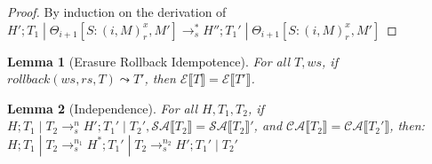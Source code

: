 \documentclass[9pt]{article}
\newtheorem{lemma}{Lemma}
\newcommand\specStep{\rightarrow_{s}}
\newcommand{\erase}[1]{\mathcal{E}\llbracket #1 \rrbracket}
\newcommand{\specActions}[1]{\mathcal{SA} \llbracket #1 \rrbracket}
\newcommand{\commitActions}[1]{\mathcal{CA} \llbracket #1 \rrbracket}
\begin{document}
\begin{proof}
By induction on the derivation of $H'; T_1 \; | \; \Theta_{i+1}[S : (i, M)_r^x, M'] \specStep^* H''; T_1' \; | \; \Theta_{i+1}[S : (i, M)_r^x, M']$
\end{proof}

\begin{lemma}[Erasure Rollback Idempotence]
\label{eraseRollbackIdempotence}
For all $T, ws$, if $rollback(ws, rs, T) \leadsto T'$, then $\erase{T} = \erase{T'}$.

\end{lemma}

\begin{lemma}[Independence]
\label{independence}
For all $H, T_1, T_2$, if $H; T_1 \; | \; T_2 \specStep^n H'; T_1' \; | \; T_2', \specActions{T_2} = \specActions{T_2}'$,  and $\commitActions{T_2} = \commitActions{T_2'}$, then: $H; T_1 \; | \; T_2 \specStep^{n_1} H^*; T_1' \; | \; T_2 \specStep^{n_2} H'; T_1' \; | \; T_2'$
\end{lemma}
\end{document}
